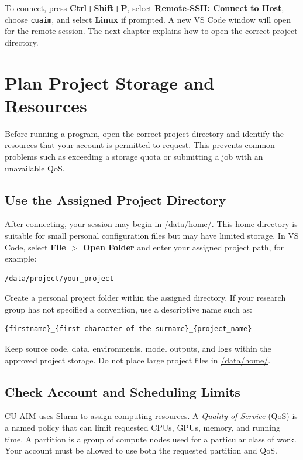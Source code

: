\documentclass[11pt,oneside]{memoir}
\begin{document}
To connect, press \textbf{Ctrl+Shift+P}, select \textbf{Remote-SSH: Connect to Host}, choose \texttt{cuaim}, and select \textbf{Linux} if prompted. A new VS Code window will open for the remote session. The next chapter explains how to open the correct project directory.


\chapter{Plan Project Storage and Resources}
\label{chap:server-resources}
Before running a program, open the correct project directory and identify the resources that your account is permitted to request. This prevents common problems such as exceeding a storage quota or submitting a job with an unavailable QoS.

\section{Use the Assigned Project Directory}
\label{sec:access-folder}

After connecting, your session may begin in \url{/data/home/}. This home directory is suitable for small personal configuration files but may have limited storage. In VS Code, select \textbf{File $>$ Open Folder} and enter your assigned project path, for example:
\begin{lstlisting}
/data/project/your_project
\end{lstlisting}

Create a personal project folder within the assigned directory. If your research group has not specified a convention, use a descriptive name such as:
\begin{lstlisting}
{firstname}_{first character of the surname}_{project_name}
\end{lstlisting}

Keep source code, data, environments, model outputs, and logs within the approved project storage. Do not place large project files in \url{/data/home/}.

\section{Check Account and Scheduling Limits}
\label{sec:check-user-resources}
CU-AIM uses Slurm to assign computing resources. A \emph{Quality of Service} (QoS) is a named policy that can limit requested CPUs, GPUs, memory, and running time. A partition is a group of compute nodes used for a particular class of work. Your account must be allowed to use both the requested partition and QoS.
\end{document}
